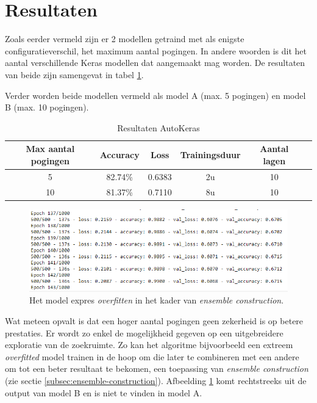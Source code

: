 \section{Resultaten}
\label{sec:results-autokeras}

Zoals eerder vermeld zijn er 2 modellen getraind met als enigste configuratieverschil, het maximum aantal pogingen. In andere woorden is dit het aantal verschillende Keras modellen dat aangemaakt mag worden. De resultaten van beide zijn samengevat in tabel \ref{table:autokeras-results}.

Verder worden beide modellen vermeld als model A (max. 5 pogingen) en model B (max. 10 pogingen).

\begin{table}[ht]
    \centering
    \begin{tabular}{c c c c c c} %
        \hline\hline %
        Max aantal pogingen & Accuracy & Loss & Trainingsduur & Aantal lagen \\ [0.5ex] %
        \hline %
        5   & 82.74\%   & 0.6383   & 2u    & 10 \\ 
        \hline %
        10   & 81.37\%   & 0.7110   & 8u    & 10 \\ 
        \hline
    \end{tabular}
    \caption{Resultaten AutoKeras}
    \label{table:autokeras-results}
\end{table}

\begin{figure}
    \centering
    \includegraphics[width=\linewidth]{img/autokeras-overfit.png}
    \caption{Het model expres \textit{overfitten} in het kader van \textit{ensemble construction}.}
    \label{fig:autokeras-overfit}
\end{figure}

Wat meteen opvalt is dat een hoger aantal pogingen geen zekerheid is op betere prestaties. Er wordt zo enkel de mogelijkheid gegeven op een uitgebreidere exploratie van de zoekruimte. Zo kan het algoritme bijvoorbeeld een extreem \textit{overfitted} model trainen in de hoop om die later te combineren met een andere om tot een beter resultaat te bekomen, een toepassing van \textit{ensemble construction} (zie sectie \ref{subsec:ensemble-construction}). Afbeelding \ref{fig:autokeras-overfit} komt rechtstreeks uit de output van model B en is niet te vinden in model A.

